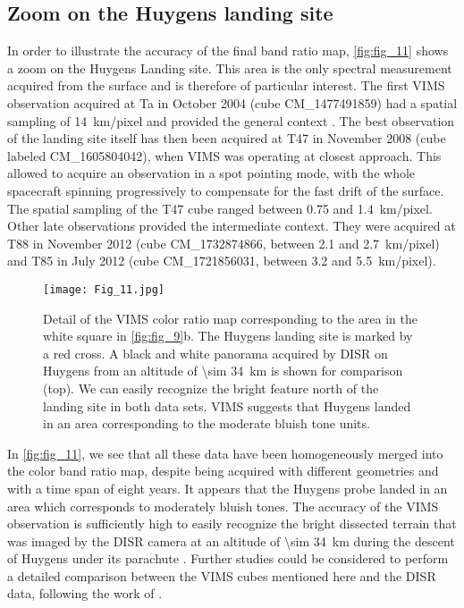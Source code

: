\documentclass[preprint,twocolumn,5p,authoryear,compress,colorlinks=true]{elsarticle}
\newcommand{\figref}[1]{\autoref{fig:#1}}
\begin{document}
{\subsection{Zoom on the Huygens landing site}
In order to illustrate the accuracy of the final band ratio map, \figref{fig_11} shows a zoom on the Huygens Landing site. This area is the only spectral measurement acquired from the surface and is therefore of particular interest. The first VIMS observation acquired at Ta in October 2004 (cube CM\_1477491859) had a spatial sampling of \SI{14}{km/pixel} and provided the general context \citep{Rodriguez2006}. The best observation of the landing site itself has then been acquired at T47 in November 2008 (cube labeled CM\_1605804042), when VIMS was operating at closest approach. This allowed to acquire an observation in a spot pointing mode, with the whole spacecraft spinning progressively to compensate for the fast drift of the surface. The spatial sampling of the T47 cube ranged between \num{0.75} and \SI{1.4}{km/pixel}. Other late observations provided the intermediate context. They were acquired at T88 in November 2012 (cube CM\_1732874866, between \num{2.1} and \SI{2.7}{km/pixel}) and T85 in July 2012 (cube CM\_1721856031, between \num{3.2} and \SI{5.5}{km/pixel}).


\begin{figure}[!ht]
 \texttt{[image: Fig\_11.jpg]}
 \caption{Detail of the VIMS color ratio map corresponding to the area in the white square in \figref{fig_9}b. The Huygens landing site is marked by a red cross. A black and white panorama acquired by DISR on Huygens from an altitude of \SI{\sim 34}{km} is shown for comparison (top). We can easily recognize the bright feature north of the landing site in both data sets. VIMS suggests that Huygens landed in an area corresponding to the moderate bluish tone units.}
 \label{fig:fig_11}
\end{figure}

In \figref{fig_11}, we see that all these data have been homogeneously merged into the color band ratio map, despite being acquired with different geometries and with a time span of eight years. It appears that the Huygens probe landed in an area which corresponds to moderately bluish tones. The accuracy of the VIMS observation is sufficiently high to easily recognize the bright dissected terrain that was imaged by the DISR camera at an altitude of \SI{\sim 34}{km} during the descent of Huygens under its parachute \citep{Tomasko2005, Karkoschka2016}. Further studies could be considered to perform a detailed comparison between the VIMS cubes mentioned here and the DISR data, following the work of \cite{Karkoschka2016}.

}
\end{document}
